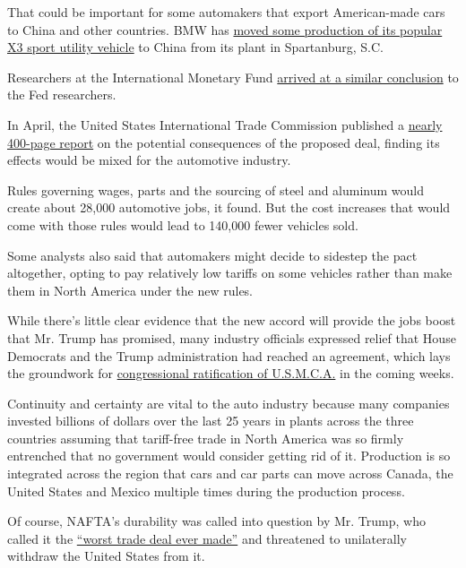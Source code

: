 That could be important for some automakers that export American-made
cars to China and other countries. BMW has
\href{https://www.nytimes.com/2018/10/26/business/china-jobs-automobiles-trade-war.html}{moved
some production of its popular X3 sport utility vehicle} to China from
its plant in Spartanburg, S.C.

Researchers at the International Monetary Fund
\href{https://www.imf.org/~/media/Files/Publications/WP/2019/WPIEA2019073.ashx}{arrived
at a similar conclusion} to the Fed researchers.

In April, the United States International Trade Commission published a
\href{https://www.usitc.gov/publications/332/pub4889.pdf}{nearly
400-page report} on the potential consequences of the proposed deal,
finding its effects would be mixed for the automotive industry.

Rules governing wages, parts and the sourcing of steel and aluminum
would create about 28,000 automotive jobs, it found. But the cost
increases that would come with those rules would lead to 140,000 fewer
vehicles sold.

Some analysts also said that automakers might decide to sidestep the
pact altogether, opting to pay relatively low tariffs on some vehicles
rather than make them in North America under the new rules.

While there's little clear evidence that the new accord will provide the
jobs boost that Mr. Trump has promised, many industry officials
expressed relief that House Democrats and the Trump administration had
reached an agreement, which lays the groundwork for
\href{https://www.nytimes.com/2020/01/16/us/politics/senate-usmca-approval-trump.html}{congressional
ratification of U.S.M.C.A.} in the coming weeks.

Continuity and certainty are vital to the auto industry because many
companies invested billions of dollars over the last 25 years in plants
across the three countries assuming that tariff-free trade in North
America was so firmly entrenched that no government would consider
getting rid of it. Production is so integrated across the region that
cars and car parts can move across Canada, the United States and Mexico
multiple times during the production process.

Of course, NAFTA's durability was called into question by Mr. Trump, who
called it the
\href{https://www.nytimes.com/2019/12/01/us/politics/trump-trade-deal-usmca.htmlhttps://www.nytimes.com/2019/12/01/us/politics/trump-trade-deal-usmca.html}{``worst
trade deal ever made''} and threatened to unilaterally withdraw the
United States from it.

